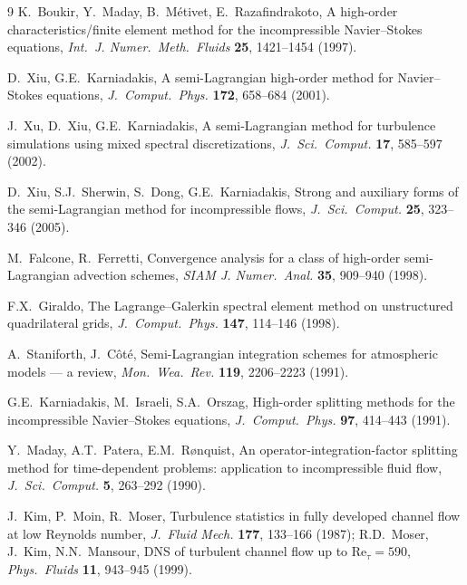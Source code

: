\documentclass[11pt,a4paper]{article}
\begin{document}
\begin{thebibliography}{9}
K.~Boukir, Y.~Maday, B.~M\'etivet, E.~Razafindrakoto,
A high-order characteristics/finite element method for the incompressible
Navier--Stokes equations,
\emph{Int.\ J. Numer.\ Meth.\ Fluids} \textbf{25}, 1421--1454 (1997).

D.~Xiu, G.E.~Karniadakis,
A semi-Lagrangian high-order method for Navier--Stokes equations,
\emph{J.~Comput.\ Phys.} \textbf{172}, 658--684 (2001).

J.~Xu, D.~Xiu, G.E.~Karniadakis,
A semi-Lagrangian method for turbulence simulations using mixed spectral
discretizations,
\emph{J.~Sci.\ Comput.} \textbf{17}, 585--597 (2002).

D.~Xiu, S.J.~Sherwin, S.~Dong, G.E.~Karniadakis,
Strong and auxiliary forms of the semi-Lagrangian method for incompressible
flows,
\emph{J.~Sci.\ Comput.} \textbf{25}, 323--346 (2005).

M.~Falcone, R.~Ferretti,
Convergence analysis for a class of high-order semi-Lagrangian advection
schemes,
\emph{SIAM J. Numer.\ Anal.} \textbf{35}, 909--940 (1998).

F.X.~Giraldo,
The Lagrange--Galerkin spectral element method on unstructured quadrilateral
grids,
\emph{J.~Comput.\ Phys.} \textbf{147}, 114--146 (1998).

A.~Staniforth, J.~C\^ot\'e,
Semi-Lagrangian integration schemes for atmospheric models --- a review,
\emph{Mon.\ Wea.\ Rev.} \textbf{119}, 2206--2223 (1991).

G.E.~Karniadakis, M.~Israeli, S.A.~Orszag,
High-order splitting methods for the incompressible Navier--Stokes equations,
\emph{J.~Comput.\ Phys.} \textbf{97}, 414--443 (1991).

Y.~Maday, A.T.~Patera, E.M.~R{\o}nquist,
An operator-integration-factor splitting method for time-dependent problems:
application to incompressible fluid flow,
\emph{J.~Sci.\ Comput.} \textbf{5}, 263--292 (1990).

J.~Kim, P.~Moin, R.~Moser,
Turbulence statistics in fully developed channel flow at low Reynolds number,
\emph{J.~Fluid Mech.} \textbf{177}, 133--166 (1987);
R.D.~Moser, J.~Kim, N.N.~Mansour,
DNS of turbulent channel flow up to $\mathrm{Re}_\tau=590$,
\emph{Phys.\ Fluids} \textbf{11}, 943--945 (1999).
\end{thebibliography}
\end{document}
